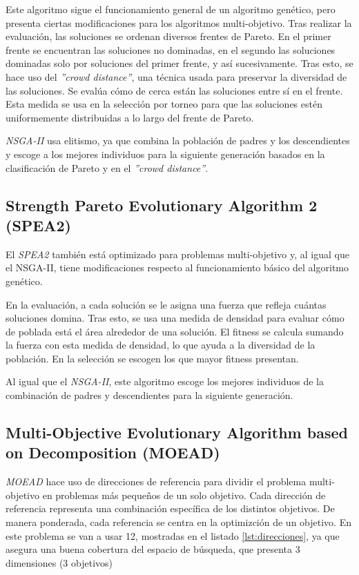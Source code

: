 Este algoritmo sigue el funcionamiento general de un algoritmo genético, pero presenta ciertas modificaciones para los algoritmos multi-objetivo. Tras realizar la evaluación, las soluciones se ordenan diversos frentes de Pareto. En el primer frente se encuentran las soluciones no dominadas, en el segundo las soluciones dominadas solo por soluciones del primer frente, y así sucesivamente. Tras esto, se hace uso del \textit{''crowd distance''}, una técnica usada para preservar la diversidad de las soluciones. Se evalúa cómo de cerca están las soluciones entre sí en el frente. Esta medida se usa en la selección por torneo para que las soluciones estén uniformemente distribuidas a lo largo del frente de Pareto.

\textit{NSGA-II} usa elitismo, ya que combina la población de padres y los descendientes y escoge a los mejores individuos para la siguiente generación basados en la clasificación de Pareto y en el \textit{''crowd distance''}.~\cite{pymoo_nsga2}

\subsection{Strength Pareto Evolutionary Algorithm 2 (SPEA2)}
\label{ch:spea2}

El \textit{SPEA2} también está optimizado para problemas multi-objetivo y, al igual que el NSGA-II, tiene modificaciones respecto al funcionamiento básico del algoritmo genético.

En la evaluación, a cada solución se le asigna una fuerza que refleja cuántas soluciones domina. Tras esto, se usa una medida de densidad para evaluar cómo de poblada está el área alrededor de una solución. El fitness se calcula sumando la fuerza con esta medida de densidad, lo que ayuda a la diversidad de la población. En la selección se escogen los que mayor fitness presentan.

Al igual que el \textit{NSGA-II}, este algoritmo escoge los mejores individuos de la combinación de padres y descendientes para la siguiente generación.~\cite{pymoo_spea2}

\subsection{Multi-Objective Evolutionary Algorithm based on Decomposition (MOEAD)}
\label{ch:moead}

\textit{MOEAD} hace uso de direcciones de referencia para dividir el problema multi-objetivo en problemas más pequeños de un solo objetivo. Cada dirección de referencia representa una combinación específica de los distintos objetivos. De manera ponderada, cada referencia se centra en la optimizción de un objetivo. En este problema se van a usar 12, mostradas en el listado \ref{lst:direcciones}, ya que asegura una buena cobertura del espacio de búsqueda, que presenta 3 dimensiones (3 objetivos)

